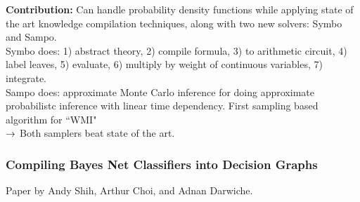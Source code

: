 {\bf Contribution:} Can handle probability density functions while applying state of the art knowledge compilation techniques, along with two new solvers: Symbo and Sampo. \\

Symbo does: 1) abstract theory, 2) compile formula, 3) to arithmetic circuit, 4) label leaves, 5) evaluate, 6) multiply by weight of continuous variables, 7) integrate. \\

Sampo does: approximate Monte Carlo inference for doing approximate probabilistc inference with linear time dependency.  First sampling based algorithm for ``WMI"\\

$\rightarrow$ Both samplers beat state of the art. \\






\subsubsection{Compiling Bayes Net Classifiers into Decision Graphs}

Paper by Andy Shih, Arthur Choi, and Adnan Darwiche. \\


